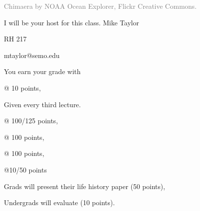 \documentclass[t]{beamer}
\begin{document}


{
\begin{frame}[b,plain]
	\hfill\tiny\textcolor{gray}{Chimaera by NOAA Ocean Explorer, Flickr Creative Commons.}
\end{frame}
}

{
\begin{frame}[t,plain]{I will be your host for this class.}
	\vspace{5ex}
	\hangpara\hspace{17em} Mike Taylor

	\hangpara\hspace{17em} RH 217

	\hangpara\hspace{17em} mtaylor@semo.edu

\end{frame}
}

\begin{frame}[t,plain]{You earn your grade with }

	\hangpara {} @ 10 points, 

	\hspace{2em} Given every third lecture.

	\hangpara {} @ 100/125 points, 

	\hangpara {} @ 100 points,
	
	\hangpara {} @ 100 points,
	
	\hangpara {} @10/50 points
	
	\hspace{2em} Grads will present their life history paper (50 points),
	
	\hspace{2em} Undergrads will evaluate (10 points).

\end{frame}
\end{document}
